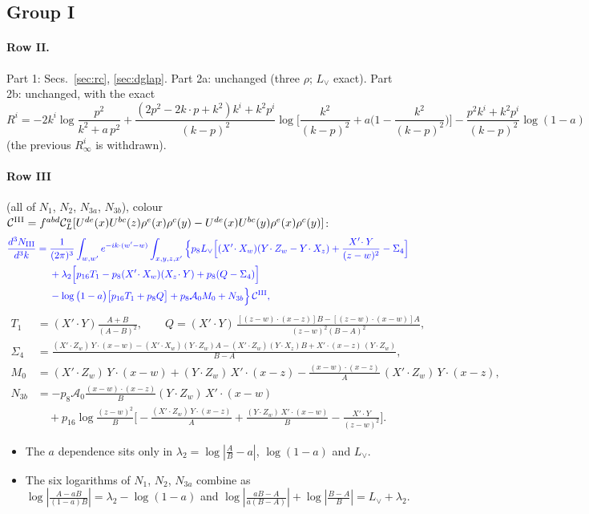 \documentclass[10pt]{article}
\numberwithin{equation}{section}
\newcommand{\new}[1]{{\color{blue}#1}}
\newcommand{\old}[1]{{\color{red}#1}}
\newcommand{\Lv}{L_{\vee}}
\newcommand{\CL}{\mathcal C_L}
\newcommand{\pre}{\frac{1}{(2\pi)^3}}
\newcommand{\phw}{e^{-ik\cdot(w'-w)}}
\newcommand{\la}{\log\big(1-a\big)}
\begin{document}
\subsection{Group I}
\paragraph{Row II.} Part 1: Secs.~\ref{sec:rc}, \ref{sec:dglap}. Part 2a: unchanged (three $\rho$; $\Lv$ exact). Part 2b: unchanged, with the exact
\begin{equation*}
R^i=-2k^i\log\frac{p^2}{k^2+a\,p^2}+\frac{(2p^2-2k\cdot p+k^2)k^i+k^2p^i}{(k-p)^2}\log\Big[\frac{k^2}{(k-p)^2}+a\Big(1-\frac{k^2}{(k-p)^2}\Big)\Big]-\frac{p^2k^i+k^2p^i}{(k-p)^2}\log(1-a)
\end{equation*}
(\old{the previous $R^i_\infty$ is withdrawn}).

\paragraph{Row III} (all of $N_1$, $N_2$, $N_{3a}$, $N_{3b}$), colour $\mathcal C^{\rm III}=f^{abd}\CL^a[U^{de}(x)U^{bc}(z)\rho^e(x)\rho^c(y)-U^{de}(x)U^{bc}(y)\rho^e(x)\rho^c(y)]$:
\begin{equation}
\new{\begin{aligned}
\frac{d^3N_{\rm III}}{d^3k}={}&\pre\int_{w,w'}\phw\int_{x,y,z,x'}\Big\{p_8\Lv\Big[(X'\!\cdot X_w)(Y\!\cdot Z_w-Y\!\cdot X_z)+\frac{X'\!\cdot Y}{(z-w)^2}-\Sigma_4\Big]\\
&+\lambda_2\Big[p_{16}T_1-p_8(X'\!\cdot X_w)(X_z\!\cdot Y)+p_8(Q-\Sigma_4)\Big]\\
&-\la\big[p_{16}T_1+p_8Q\big]+p_8\mathcal A_0M_0+N_{3b}\Big\}\,\mathcal C^{\rm III},
\end{aligned}}
\label{eq:III}
\end{equation}
\begin{align*}
T_1&=(X'\!\cdot Y)\frac{A+B}{(A-B)^2},\qquad Q=(X'\!\cdot Y)\,\frac{[(z-w)\cdot(x-z)]B-[(z-w)\cdot(x-w)]A}{(z-w)^2(B-A)^2},\\
\Sigma_4&=\frac{(X'\!\cdot Z_w)\,Y\!\cdot(x-w)-(X'\!\cdot X_w)(Y\!\cdot Z_w)A-(X'\!\cdot Z_w)(Y\!\cdot X_z)B+X'\!\cdot(x-z)\,(Y\!\cdot Z_w)}{B-A},\\
M_0&=(X'\!\cdot Z_w)\,Y\!\cdot(x-w)+(Y\!\cdot Z_w)\,X'\!\cdot(x-z)-\frac{(x-w)\cdot(x-z)}{A}\,(X'\!\cdot Z_w)\,Y\!\cdot(x-z),\\
N_{3b}&=-p_8\mathcal A_0\frac{(x-w)\cdot(x-z)}{B}(Y\!\cdot Z_w)\,X'\!\cdot(x-w)\\&\quad+p_{16}\log\frac{(z-w)^2}{B}\Big[-\frac{(X'\!\cdot Z_w)\,Y\!\cdot(x-z)}{A}+\frac{(Y\!\cdot Z_w)\,X'\!\cdot(x-w)}{B}-\frac{X'\!\cdot Y}{(z-w)^2}\Big].
\end{align*}
\begin{itemize}
\item The $a$ dependence sits only in $\lambda_2=\log|\frac AB-a|$, $\log(1-a)$ and $\Lv$.
\item The six logarithms of $N_1$, $N_2$, $N_{3a}$ combine as $\log|\frac{A-aB}{(1-a)B}|=\lambda_2-\log(1-a)$ and $\log|\frac{aB-A}{a(B-A)}|+\log|\frac{B-A}{B}|=\Lv+\lambda_2$.
\end{itemize}
\end{document}
